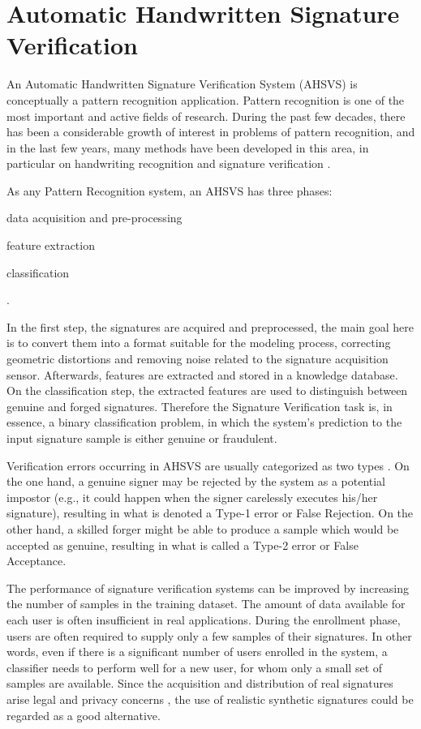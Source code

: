 \section{Automatic Handwritten Signature Verification}
An Automatic Handwritten Signature Verification System (AHSVS) is conceptually a pattern recognition application. Pattern recognition is one of the most important and active fields of research. During the past few decades, there has been a considerable growth of interest in problems of pattern recognition, and in the last few years, many methods have been developed in this area, in particular on handwriting recognition and signature verification \cite{book}. 

As any Pattern Recognition system, an AHSVS has three phases:
\begin{inlinelist}
\item data acquisition and pre-processing
\item feature extraction
\item classification
\end{inlinelist} \cite{impedovo2008state}.

In the first step, the signatures are acquired and preprocessed, the main goal here is to convert them into a format suitable for the modeling process, correcting geometric distortions and removing noise related to the signature acquisition sensor. Afterwards, features are extracted and stored in a knowledge database.  On the classification step, the extracted features are used to distinguish between genuine and forged signatures. Therefore the Signature Verification task is, in essence, a binary classification problem, in which the system's prediction to the input signature sample is either genuine or fraudulent.

Verification errors occurring in AHSVS are usually categorized as two types \cite{fairhurst1997signature}. On the one hand, a genuine signer may be rejected by the system as a potential impostor (e.g., it could happen when the signer carelessly executes his/her signature), resulting in what is denoted a Type-1 error or False
Rejection. On the other hand, a skilled forger might be able to produce a sample which would be accepted as genuine, resulting in what is called a Type-2 error or False Acceptance. 

The performance of signature verification systems can be improved by increasing the number of samples in the training dataset. The amount of data available for each user is often insufficient in real applications. During the enrollment phase,
users are often required to supply only a few samples of their signatures. In other words, even if there is a significant number of users enrolled in the system, a classifier needs to perform well for a new user, for whom only a small set of samples are available. Since the acquisition and distribution of real signatures arise legal and privacy concerns \cite{diaz2014generation}, the use of realistic synthetic signatures could be
regarded as a good alternative. 

